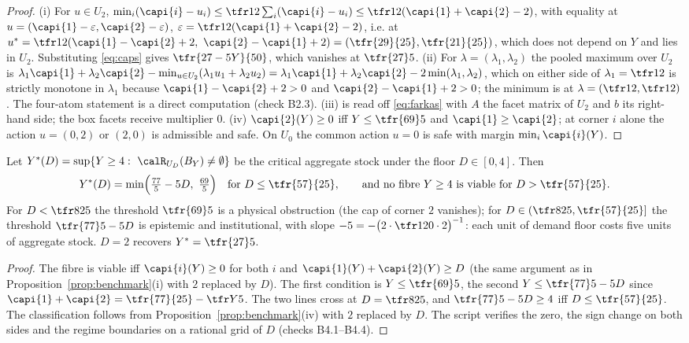 \begin{proof}
(i) For $u\in U_2$, $\min_i(\capi{i}-u_i)\le\tfr12\sum_i(\capi{i}-u_i)\le\tfr12(\capi{1}+\capi{2}-2)$, with equality at $u=(\capi{1}-\varepsilon,\capi{2}-\varepsilon)$, $\varepsilon=\tfr12(\capi{1}+\capi{2}-2)$, i.e. at $u^\ast=\tfr12(\capi{1}-\capi{2}+2,\ \capi{2}-\capi{1}+2)=(\tfr{29}{25},\tfr{21}{25})$, which does not depend on $Y$ and lies in $U_2$. Substituting \eqref{eq:caps} gives $\tfr{27-5Y}{50}$, which vanishes at $\tfr{27}5$. (ii) For $\lambda=(\lambda_1,\lambda_2)$ the pooled maximum over $U_2$ is $\lambda_1\capi{1}+\lambda_2\capi{2}-\min_{u\in U_2}(\lambda_1u_1+\lambda_2u_2)=\lambda_1\capi{1}+\lambda_2\capi{2}-2\min(\lambda_1,\lambda_2)$, which on either side of $\lambda_1=\tfr12$ is strictly monotone in $\lambda_1$ because $\capi{1}-\capi{2}+2>0$ and $\capi{2}-\capi{1}+2>0$; the minimum is at $\lambda=(\tfr12,\tfr12)$. The four-atom statement is a direct computation (check B2.3). (iii) is read off \eqref{eq:farkas} with $A$ the facet matrix of $U_2$ and $b$ its right-hand side; the box facets receive multiplier $0$. (iv) $\capi{2}(Y)\ge0$ iff $Y\le\tfr{69}5$ and $\capi{1}\ge\capi{2}$; at corner $i$ alone the action $u=(0,2)$ or $(2,0)$ is admissible and safe. On $U_0$ the common action $u=0$ is safe with margin $\min_i\capi{i}(Y)$.
\end{proof}

\begin{proposition}\label{prop:floor}
Let $Y^\ast(D)=\sup\{Y\ge4:\ \calR_{U_D}(B_Y)\neq\emptyset\}$ be the critical aggregate stock under the floor $D\in[0,4]$. Then
\begin{equation}\label{eq:floorlaw}
Y^\ast(D)=\min\Bigl(\tfrac{77}{5}-5D,\ \tfrac{69}{5}\Bigr)\quad\text{for }D\le\tfr{57}{25},\qquad\text{and no fibre } Y\ge4 \text{ is viable for } D>\tfr{57}{25}.
\end{equation}
For $D<\tfr8{25}$ the threshold $\tfr{69}5$ is a physical obstruction (the cap of corner $2$ vanishes); for $D\in(\tfr8{25},\tfr{57}{25}]$ the threshold $\tfr{77}5-5D$ is epistemic and institutional, with slope $-5=-\bigl(2\cdot\tfr1{20}\cdot2\bigr)^{-1}$: each unit of demand floor costs five units of aggregate stock. $D=2$ recovers $Y^\ast=\tfr{27}5$.
\end{proposition}

\begin{proof}
The fibre is viable iff $\capi{i}(Y)\ge0$ for both $i$ and $\capi{1}(Y)+\capi{2}(Y)\ge D$ (the same argument as in Proposition~\ref{prop:benchmark}(i) with $2$ replaced by $D$). The first condition is $Y\le\tfr{69}5$, the second $Y\le\tfr{77}5-5D$ since $\capi{1}+\capi{2}=\tfr{77}{25}-\tfr Y5$. The two lines cross at $D=\tfr8{25}$, and $\tfr{77}5-5D\ge4$ iff $D\le\tfr{57}{25}$. The classification follows from Proposition~\ref{prop:benchmark}(iv) with $2$ replaced by $D$. The script verifies the zero, the sign change on both sides and the regime boundaries on a rational grid of $D$ (checks B4.1--B4.4).
\end{proof}

